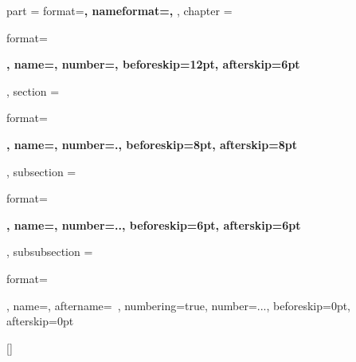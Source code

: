 \ctexset
{
    part =
    {
        format=\centering{}\bfseries,
        nameformat=\centering\heiti\fontsize{48}{48}\bfseries,
    },
    chapter =
    {
        format=\raggedright{}\bfseries,
        name={},
        number=,
        beforeskip=12pt,
        afterskip=6pt
    },
    section =
    {
        format=\raggedright{}\bfseries,
        name={},
        number=.,
        beforeskip=8pt,
        afterskip=8pt
    },
    subsection =
    {
        format=\raggedright{}\bfseries,
        name={},
        number=..,
        beforeskip=6pt,
        afterskip=6pt
    },
    subsubsection =
    {
        format=\raggedright{},
        name={},
        aftername=~,
        numbering=true,
        number=...,
        beforeskip=0pt,
        afterskip=0pt
    }
}

\makeatletter
{}
\makeatother

\renewcommand{\contentsname}{目录}
\newcommand{\markloc}{\addcontentsline{toc}{chapter}{目录}}
\renewcommand{\listfigurename}{图目录}
\newcommand{\marklof}{\addcontentsline{toc}{chapter}{图目录}}
\renewcommand{\listtablename}{表目录}
\newcommand{\marklot}{\addcontentsline{toc}{chapter}{表目录}}
\renewcommand{\listalgorithmname}{算法目录}
\newcommand{\markloa}{\addcontentsline{toc}{chapter}{算法目录}}

[\bibname]{
}
